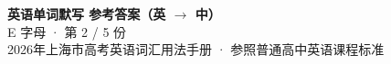 \documentclass[10pt,a4paper]{article}
\begin{document}
\pagestyle{plain}

\begin{center}
{\LARGE\bfseries 英语单词默写 \quad 参考答案（英 $\to$ 中）}\\[0.22em]
{\large E 字母 · 第 2 / 5 份}\\[0.18em]
{\small 2026年上海市高考英语词汇用法手册 · 参照普通高中英语课程标准}
\end{center}

\vspace{0.2em}
\noindent{\color{rulegray}\rule{\textwidth}{0.8pt}}

\vspace{0.35em}

\vspace{0.25em}
\renewcommand{\arraystretch}{1.32}
\end{document}
